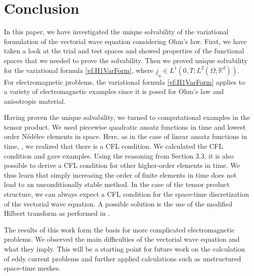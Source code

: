 \documentclass[a4paper,11pt]{article}
\newcommand{\R}{\mathbb R}
\renewcommand{\vec}[1]{\underline{#1}}
\begin{document}
\section{Conclusion} \label{Sec:Zum}	
In this paper, we have investigated the unique solvability of the variational formulation of the vectorial wave equation considering Ohm's law. First, we have taken a look at the trial and test spaces and showed properties of the functional spaces that we needed to prove the solvability. Then we proved unique solvability for the variational formula \eqref{vf:H1VarForm}, where $\vec j_a\in L^1(0,T;L^2(\Omega;\R^d))$. For electromagnetic problems, the variational formula \eqref{vf:H1VarForm} applies to a variety of electromagnetic examples since it is posed for Ohm's law and anisotropic material.

Having proven the unique solvability, we turned to computational examples in the tensor product. We used piecewise quadratic ansatz functions in time and lowest order Nédélec elements in space. Here, as in the case of linear ansatz functions in time, \cite{HauserZank2023}, we realized that there is a CFL condition. We calculated the CFL condition and gave examples. Using the reasoning from Section 3.3, it is also possible to derive a CFL condition for other higher-order elements in time. We thus learn that simply increasing the order of finite elements in time does not lead to an unconditionally stable method. In the case of the tensor product structure, we can always expect a CFL condition for the space-time discretization of the vectorial wave equation. A possible solution is the use of the modified Hilbert transform as performed in \cite{HauserZank2023}. 

The results of this work form the basis for more complicated electromagnetic problems. We observed
the main difficulties of the vectorial wave equation and what they imply. This will be a starting point for future work on the calculation of eddy current problems and further applied calculations such as unstructured space-time meshes.


		
	
	
\end{document}

